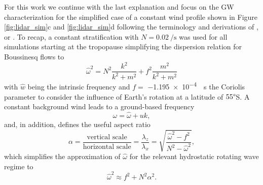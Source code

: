 For this work we continue with the last explanation and focus on the GW characterization for the simplified case of a constant wind profile shown in Figure \ref{fig:lidar_sim}c and \ref{fig:lidar_sim}d following the terminology and derivations of \textcite[]{gill_atmosphere-ocean_1982}, \textcite[]{fritts_gravity_2003} or \textcite[]{dornbrack_interpretation_2017}. To recap, a constant stratification with $N=\SI{0.02}{\per \second}$ was used for all simulations starting at the tropopause simplifying the dispersion relation for Boussinesq flows to
\begin{equation}
    \hat{\omega}^2 = N^2 \frac{k^2}{k^2+m^2} + f^2 \frac{m^2}{k^2+m^2}
    \label{equ_lid:dispersion}
\end{equation}
with $\hat{w}$ being the intrinsic frequency and $f=$ \SI{-1.195e-4}{\per \second} the Coriolis parameter to consider the influence of Earth's rotation at a latitude of $55\degree$S. A constant background wind leads to a ground-based frequency
\begin{equation}
    \omega = \hat{\omega} + uk,
    \label{equ_lid:omega}
\end{equation}
and, in addition, \textcite{gill_atmosphere-ocean_1982} defines the useful aspect ratio
\begin{equation}
    \alpha = \frac{\text{vertical scale}}{\text{horizontal scale}} = \frac{\lambda_z}{\lambda_x} = \sqrt{\frac{\hat{\omega}^2-f^2}{N^2-\hat{\omega}^2}},
    \label{equ_lid:alpha}
\end{equation}
which simplifies the approximation of $\hat{\omega}$ for the relevant hydrostatic rotating wave regime to
\begin{equation}
    \hat{\omega}^2 \approx f^2 + N^2 \alpha^2.
    \label{equ_lid:omega_simp}
\end{equation}
